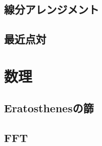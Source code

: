 \documentclass[landscape,twocolumn,9pt]{jsarticle}
\begin{document}
\subsection{線分アレンジメント}


\subsection{最近点対}


\section{数理}

\subsection{Eratosthenesの篩}


\subsection{FFT}

\end{document}
